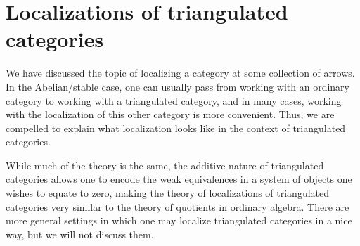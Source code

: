 
\section{Localizations of triangulated categories}\label{lecture:localizations-of-triangulated-categories}
We have discussed the topic of localizing a category at some collection of arrows. In the Abelian/stable case, one can usually pass from working with an ordinary category to working with
a triangulated category, and in many cases, working with the localization of this other category is more convenient. Thus, we are compelled to explain what localization looks like in the
context of triangulated categories.

While much of the theory is the same, the additive nature of triangulated categories allows one to encode the weak equivalences in a system of objects one wishes to equate to zero,
making the theory of localizations of triangulated categories very similar to the theory of quotients in ordinary algebra. There are more general settings in which one may localize
triangulated categories in a nice way, but we will not discuss them.

